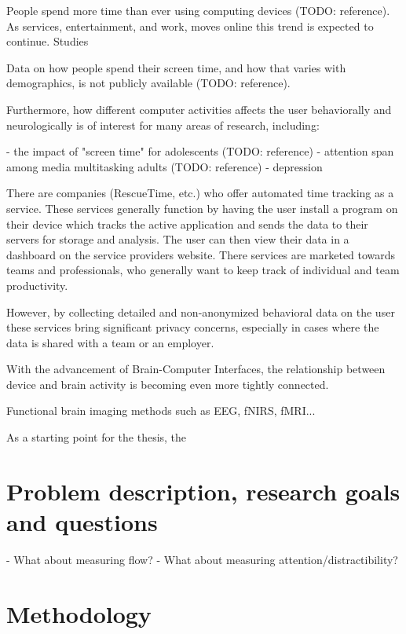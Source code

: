 \documentclass[a4paper]{article}   %
\begin{document}
\begin{markdown}
People spend more time than ever using computing devices (TODO: reference). As services, entertainment, and work, moves online this trend is expected to continue. Studies

Data on how people spend their screen time, and how that varies with demographics, is not publicly available (TODO: reference).

Furthermore, how different computer activities affects the user behaviorally and neurologically is of interest for many areas of research, including:

 - the impact of "screen time" for adolescents (TODO: reference)
 - attention span among media multitasking adults (TODO: reference)
 - depression

There are companies (RescueTime, etc.) who offer automated time tracking as a service. These services generally function by having the user install a program on their device which tracks the active application and sends the data to their servers for storage and analysis. The user can then view their data in a dashboard on the service providers website. There services are marketed towards teams and professionals, who generally want to keep track of individual and team productivity.

However, by collecting detailed and non-anonymized behavioral data on the user these services bring significant privacy concerns, especially in cases where the data is shared with a team or an employer.

With the advancement of Brain-Computer Interfaces, the relationship between device and brain activity is becoming even more tightly connected.

Functional brain imaging methods such as EEG, fNIRS, fMRI...

As a starting point for the thesis, the
\end{markdown}

\section{Problem description, research goals and questions}
\begin{markdown}

 - What about measuring flow?
 - What about measuring attention/distractibility?

\end{markdown}

\section{Methodology}
\end{document}
